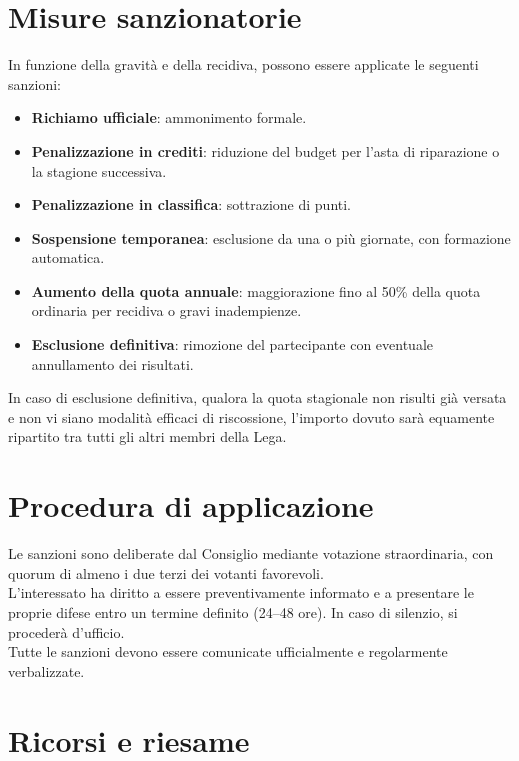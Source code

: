 \section{Misure sanzionatorie}
\label{art:3.3}

\noindent
In funzione della gravità e della recidiva, possono essere applicate le seguenti sanzioni:
\begin{itemize}
  \item \textbf{Richiamo ufficiale}: ammonimento formale.
  \item \textbf{Penalizzazione in crediti}: riduzione del budget per l’asta di riparazione o la stagione successiva.
  \item \textbf{Penalizzazione in classifica}: sottrazione di punti.
  \item \textbf{Sospensione temporanea}: esclusione da una o più giornate, con formazione automatica.
  \item \textbf{Aumento della quota annuale}: maggiorazione fino al 50\% della quota ordinaria per recidiva o gravi inadempienze.
  \item \textbf{Esclusione definitiva}: rimozione del partecipante con eventuale annullamento dei risultati.
\end{itemize}

In caso di esclusione definitiva, qualora la quota stagionale non risulti già versata e non vi siano modalità efficaci di riscossione, l’importo dovuto sarà equamente ripartito tra tutti gli altri membri della Lega.

\section{Procedura di applicazione}
\label{art:3.4}

Le sanzioni sono deliberate dal Consiglio mediante votazione straordinaria, con quorum di almeno i due terzi dei votanti favorevoli.\\
L’interessato ha diritto a essere preventivamente informato e a presentare le proprie difese entro un termine definito (24–48 ore). In caso di silenzio, si procederà d’ufficio.\\
Tutte le sanzioni devono essere comunicate ufficialmente e regolarmente verbalizzate.

\section{Ricorsi e riesame}
\label{art:3.5}

